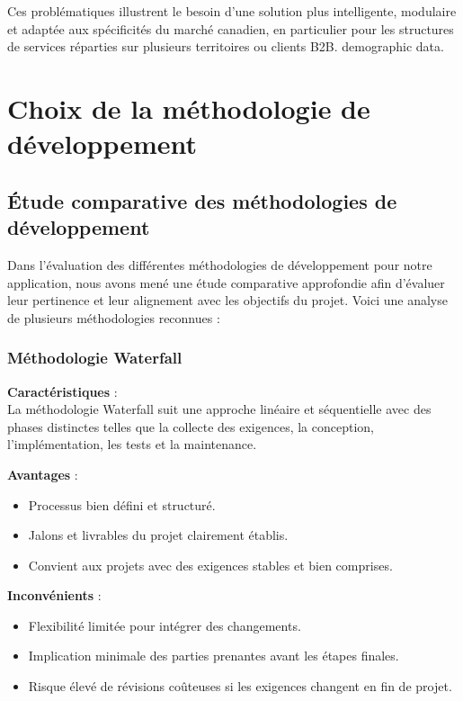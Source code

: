 Ces problématiques illustrent le besoin d’une solution plus intelligente, modulaire et adaptée aux spécificités du marché canadien, en particulier pour les structures de services réparties sur plusieurs territoires ou clients B2B.
demographic data.\\[1mm]

\section{Choix de la méthodologie de développement}

\subsection{Étude comparative des méthodologies de développement}

Dans l’évaluation des différentes méthodologies de développement pour notre application, nous avons mené une étude comparative approfondie afin d’évaluer leur pertinence et leur alignement avec les objectifs du projet. Voici une analyse de plusieurs méthodologies reconnues :

\subsubsection*{Méthodologie Waterfall}
\textbf{Caractéristiques} :\\
La méthodologie Waterfall suit une approche linéaire et séquentielle avec des phases distinctes telles que la collecte des exigences, la conception, l'implémentation, les tests et la maintenance.

\textbf{Avantages} :
\begin{itemize}
    \item Processus bien défini et structuré.
    \item Jalons et livrables du projet clairement établis.
    \item Convient aux projets avec des exigences stables et bien comprises.
\end{itemize}

\textbf{Inconvénients} :
\begin{itemize}
    \item Flexibilité limitée pour intégrer des changements.
    \item Implication minimale des parties prenantes avant les étapes finales.
    \item Risque élevé de révisions coûteuses si les exigences changent en fin de projet.
\end{itemize}

